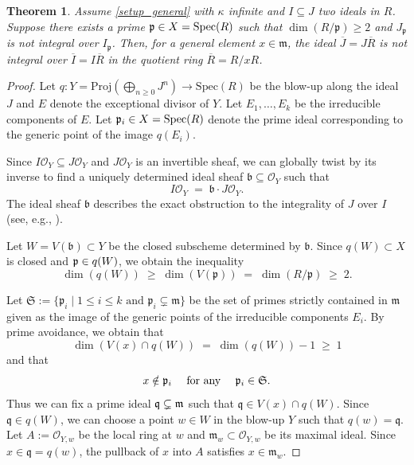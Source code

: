 \documentclass[a4paper, 11pt]{amsart}
\newcommand{\mm}{{\normalfont\mathfrak{m}}}
\newcommand{\pp}{{\normalfont\mathfrak{p}}}
\newcommand{\Spec}{\normalfont\text{Spec}}
\newtheorem{theorem}{Theorem}[section]
\theoremstyle{definition}
\begin{document}
	\begin{theorem}
		\label{thm_gen_cut_mm}
		Assume \autoref{setup_general} with $\kappa$ infinite and $I \subseteq J$ two ideals in $R$. Suppose there exists a prime  $\mathfrak{p} \in X = \Spec(R)$ such that $\dim(R/\mathfrak{p}) \geq 2$ and $J_\mathfrak{p}$ is not integral over $I_\mathfrak{p}$. 
		Then, for a general element $x \in \mathfrak{m}$, the ideal $\overline{J} = J\overline{R}$ is not integral over $\overline{I} = I\overline{R}$ in the quotient ring $\overline{R} = R/xR$.
	\end{theorem}
	\begin{proof}
		Let $q : Y = \text{Proj}\left(\bigoplus_{n \geq 0} J^n\right) \rightarrow \text{Spec}(R)$ be the blow-up along the ideal $J$ and $E$ denote the exceptional divisor of $Y$. 
		Let $E_1,\ldots, E_k$ be the irreducible components of $E$.
		Let $\mathfrak{p}_i \in X = \Spec(R)$ denote the prime ideal corresponding to the generic point of the image $q(E_i)$.
		
		Since $I\mathscr{O}_Y \subseteq J\mathscr{O}_Y$ and $J\mathscr{O}_Y$ is an invertible sheaf, we can globally twist by its inverse to find a uniquely determined ideal sheaf $\mathfrak{b} \subseteq \mathscr{O}_Y$ such that
		$$
		I\mathscr{O}_Y \;=\;  \mathfrak{b} \cdot J\mathscr{O}_Y.
		$$
		The ideal sheaf $\mathfrak{b}$ describes the exact obstruction to the integrality of $J$ over $I$ (see, e.g., \cite[Corollary~1.2.5, \S8.2]{SwHu}).
		
		
		Let $W = V(\mathfrak{b}) \subset Y$ be the closed subscheme determined by $\mathfrak{b}$.
		Since $q(W) \subset X$ is closed and $\pp \in q(W)$, we obtain the inequality
		$$
		\dim(q(W)) \;\geq\; \dim(V(\mathfrak{p})) \;=\; \dim(R/\mathfrak{p}) \;\geq\; 2.
		$$
		
		Let
		$
		\mathfrak{S} :=  \lbrace \mathfrak{p}_i \mid 1 \le i \le k \text{ and } \mathfrak{p}_i \subsetneq \mathfrak{m} \rbrace
		$
		be the set of primes strictly contained in $\mathfrak{m}$ given as the image of the generic points of the irreducible components $E_i$.
		By prime avoidance, we obtain that 
		$$
		\dim\left(V(x) \cap q(W)\right) \;=\; \dim(q(W)) - 1 \;\geq\; 1
		$$
		and that 
		$$
		\text{$x \notin \mathfrak{p}_i$ \quad for any  \quad $\mathfrak{p}_i \in \mathfrak{S}$.}
		$$
		Thus we can fix a prime ideal $\mathfrak{q} \subsetneq \mm$ such that $\mathfrak{q} \in V(x) \cap q(W)$. 
		Since $\mathfrak{q} \in q(W)$, we can choose a point $w \in W$ in the blow-up $Y$ such that $q(w) = \mathfrak{q}$.
		Let $A := \mathscr{O}_{Y,w}$ be the local ring at $w$ and $\mathfrak{m}_w \subset \mathscr{O}_{Y,w}$ be its maximal ideal. 
		Since $x \in \mathfrak{q} = q(w)$, the pullback of $x$ into $A$ satisfies $x \in \mathfrak{m}_w$.
		

\end{proof}
\end{document}
